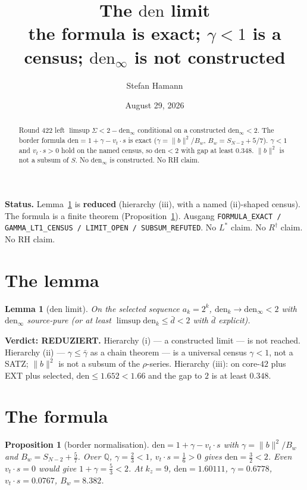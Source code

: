\documentclass[11pt]{article}
\title{\bfseries The $\mathrm{den}$ limit\\[2mm]
\large the formula is exact; $\gamma<1$ is a census;
$\mathrm{den}_\infty$ is not constructed}
\author{Stefan Hamann}
\date{August 29, 2026}
\newtheorem{lemma}{Lemma}
\newtheorem{prop}{Proposition}
\theoremstyle{remark}
\begin{document}
\maketitle

\begin{abstract}\noindent
Round 422 left $\limsup\Sigma<2-\mathrm{den}_\infty$
conditional on a constructed $\mathrm{den}_\infty<2$.
The border formula
$\mathrm{den}=1+\gamma-v_t\cdot s$ is exact
($\gamma=\|b\|^2/B_w$, $B_w=S_{N-2}+5/7$).
$\gamma<1$ and $v_t\cdot s>0$ hold on the named
census, so $\mathrm{den}<2$ with gap at least $0.348$.
$\|b\|^2$ is not a subsum of $S$.
No $\mathrm{den}_\infty$ is constructed.
No RH claim.
\end{abstract}

\medskip\noindent
\textbf{Status.}\enspace
Lemma~\ref{lem:den} is \textbf{reduced}
(hierarchy (iii), with a named (ii)-shaped census).
The formula is a finite theorem
(Proposition~\ref{prop:den}).
Ausgang \texttt{FORMULA\_EXACT / GAMMA\_LT1\_CENSUS / LIMIT\_OPEN / SUBSUM\_REFUTED}.
No $L^{*}$ claim.  No $R^{\dagger}$ claim.  No RH claim.

\section{The lemma}\label{sec:lem}

\begin{lemma}[$\mathrm{den}$ limit]\label{lem:den}
On the selected sequence $a_k=2^k$,
$\mathrm{den}_k\to\mathrm{den}_\infty<2$ with
$\mathrm{den}_\infty$ source-pure
(or at least $\limsup\mathrm{den}_k\le\bar d<2$
with $\bar d$ explicit).
\end{lemma}

\noindent
\textbf{Verdict: REDUZIERT.}
Hierarchy (i) --- a constructed limit --- is not
reached.
Hierarchy (ii) --- $\gamma\le\bar\gamma$ as a chain
theorem --- is a universal census $\gamma<1$, not a
SATZ; $\|b\|^2$ is not a subsum of the $\rho$-series.
Hierarchy (iii): on core-$42$ plus EXT plus selected,
$\mathrm{den}\le 1.652<1.66$ and the gap to $2$ is
at least $0.348$.

\section{The formula}\label{sec:form}

\begin{prop}[border normalisation]\label{prop:den}
$\mathrm{den}=1+\gamma-v_t\cdot s$ with
$\gamma=\|b\|^2/B_w$ and $B_w=S_{N-2}+\tfrac57$.
Over $\mathbb{Q}$, $\gamma=\tfrac23<1$,
$v_t\cdot s=\tfrac16>0$ gives $\mathrm{den}=\tfrac32<2$.
Even $v_t\cdot s=0$ would give $1+\gamma=\tfrac53<2$.
At $k_z=9$,
$\mathrm{den}=1.60111$, $\gamma=0.6778$,
$v_t\cdot s=0.0767$, $B_w=8.382$.
\end{prop}
\end{document}
